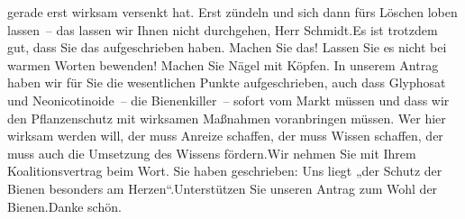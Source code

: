 \documentclass{article}
\begin{document}
gerade erst wirksam versenkt hat. Erst zündeln und sich dann fürs Löschen loben lassen – das lassen wir Ihnen nicht durchgehen, Herr Schmidt.Es ist trotzdem gut, dass Sie das aufgeschrieben haben. Machen Sie das! Lassen Sie es nicht bei warmen Worten bewenden! Machen Sie Nägel mit Köpfen. In unserem Antrag haben wir für Sie die wesentlichen Punkte aufgeschrieben, auch dass Glyphosat und Neonicotinoide – die Bienenkiller – sofort vom Markt müssen und dass wir den Pflanzenschutz mit wirksamen Maßnahmen voranbringen müssen. Wer hier wirksam werden will, der muss Anreize schaffen, der muss Wissen schaffen, der muss auch die Umsetzung des Wissens fördern.Wir nehmen Sie mit Ihrem Koalitionsvertrag beim Wort. Sie haben geschrieben: Uns liegt „der Schutz der Bienen besonders am Herzen“.Unterstützen Sie unseren Antrag zum Wohl der Bienen.Danke schön.
\end{document}
